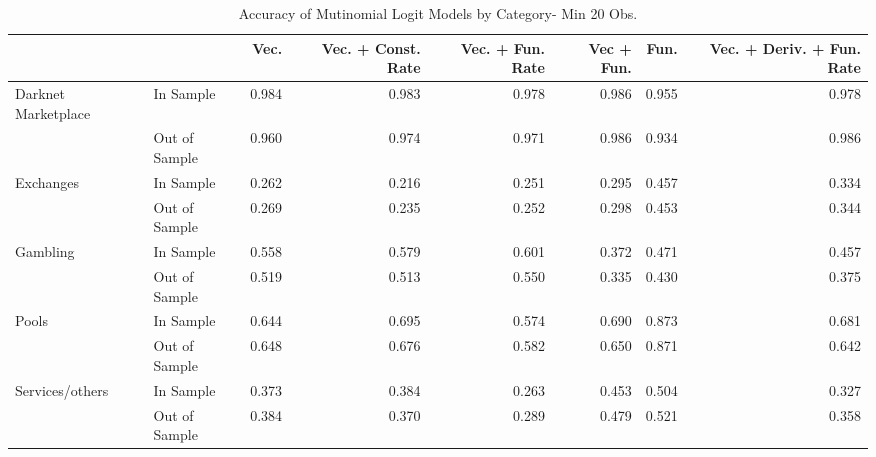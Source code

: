 \begin{table}[ht]
\centering
\begin{tabular}{llrrrrrr}
  \hline
 &  & Vec. & Vec. + Const. Rate & Vec. + Fun. Rate & Vec + Fun. & Fun. & Vec. + Deriv. + Fun. Rate \\ 
  \hline
Darknet Marketplace & In Sample & 0.984 & 0.983 & 0.978 & 0.986 & 0.955 & 0.978 \\ 
   & Out of Sample & 0.960 & 0.974 & 0.971 & 0.986 & 0.934 & 0.986 \\ 
  Exchanges & In Sample & 0.262 & 0.216 & 0.251 & 0.295 & 0.457 & 0.334 \\ 
   & Out of Sample & 0.269 & 0.235 & 0.252 & 0.298 & 0.453 & 0.344 \\ 
  Gambling & In Sample & 0.558 & 0.579 & 0.601 & 0.372 & 0.471 & 0.457 \\ 
   & Out of Sample & 0.519 & 0.513 & 0.550 & 0.335 & 0.430 & 0.375 \\ 
  Pools & In Sample & 0.644 & 0.695 & 0.574 & 0.690 & 0.873 & 0.681 \\ 
   & Out of Sample & 0.648 & 0.676 & 0.582 & 0.650 & 0.871 & 0.642 \\ 
  Services/others & In Sample & 0.373 & 0.384 & 0.263 & 0.453 & 0.504 & 0.327 \\ 
   & Out of Sample & 0.384 & 0.370 & 0.289 & 0.479 & 0.521 & 0.358 \\ 
   \hline
\end{tabular}
\caption{Accuracy of Mutinomial Logit Models by Category- Min 20 Obs.} 
\label{multi_20obs_acc_cat}
\end{table}
